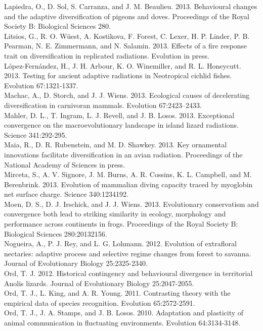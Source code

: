 \documentclass[a4paper,12pt]{article}
\begin{document}
Lapiedra, O., D. Sol, S. Carranza, and J. M. Beaulieu. 2013. Behavioural changes and the adaptive diversification of pigeons and doves. Proceedings of the Royal Society B: Biological Sciences 280.\\
Litsios, G., R. O. Wüest, A. Kostikova, F. Forest, C. Lexer, H. P. Linder, P. B. Pearman, N. E. Zimmermann, and N. Salamin. 2013. Effects of a fire response trait on diversification in replicated radiations. Evolution in press.\\
L\'{o}pez-Fern\'{a}ndez, H., J. H. Arbour, K. O. Winemiller, and R. L. Honeycutt. 2013. Testing for ancient adaptive radiations in Neotropical cichlid fishes. Evolution 67:1321-1337.\\
Machac, A., D. Storch, and J. J. Wiens. 2013. Ecological causes of decelerating diversification in carnivoran mammals. Evolution 67:2423–2433.\\
Mahler, D. L., T. Ingram, L. J. Revell, and J. B. Losos. 2013. Exceptional convergence on the macroevolutionary landscape in island lizard radiations. Science 341:292-295.\\
Maia, R., D. R. Rubenstein, and M. D. Shawkey. 2013. Key ornamental innovations facilitate diversification in an avian radiation. Proceedings of the National Academy of Sciences in press.\\
Mirceta, S., A. V. Signore, J. M. Burns, A. R. Cossins, K. L. Campbell, and M. Berenbrink. 2013. Evolution of mammalian diving capacity traced by myoglobin net surface charge. Science 340:1234192.\\
Moen, D. S., D. J. Irschick, and J. J. Wiens. 2013. Evolutionary conservatism and convergence both lead to striking similarity in ecology, morphology and performance across continents in frogs. Proceedings of the Royal Society B: Biological Sciences 280:20132156.\\
Nogueira, A., P. J. Rey, and L. G. Lohmann. 2012. Evolution of extrafloral nectaries: adaptive process and selective regime changes from forest to savanna. Journal of Evolutionary Biology 25:2325-2340.\\
Ord, T. J. 2012. Historical contingency and behavioural divergence in territorial Anolis lizards. Journal of Evolutionary Biology 25:2047-2055.\\
Ord, T. J., L. King, and A. R. Young. 2011. Contrasting theory with the empirical data of species recognition. Evolution 65:2572-2591.\\
Ord, T. J., J. A. Stamps, and J. B. Losos. 2010. Adaptation and plasticity of animal communication in fluctuating environments. Evolution 64:3134-3148.\\
\end{document}
